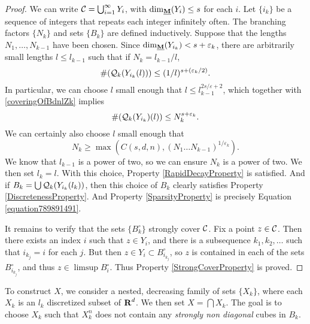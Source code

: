 \begin{proof}
	We can write $\operatorname{\mathcal{C}} = \bigcup_{i = 1}^\infty Y_i$, with $\operatorname{\dim_{\underline{\mathbf{M}}}}(Y_i) \leq s$ for each $i$. Let $\{ i_k \}$ be a sequence of integers that repeats each integer infinitely often. The branching factors $\{ N_k \}$ and sets $\{ B_k \}$ are defined inductively. Suppose that the lengths $N_1, \ldots, N_{k-1}$ have been chosen. Since $\operatorname{\dim_{\underline{\mathbf{M}}}}(Y_{i_k}) < s + \varepsilon_k$, there are arbitrarily small lengths $l \leq l_{k-1}$ such that if $N_k = l_{k-1}/l$,
	\begin{equation} \label{coveringOfBdnlZk}
		\# (\operatorname{\mathcal{Q}}_k(Y_{i_k}(l))) \leq (1/l)^{s + (\varepsilon_k/2)}.
	\end{equation}
	In particular, we can choose $l$ small enough that $l \leq l_{k-1}^{2s/\varepsilon + 2}$, which together with \eqref{coveringOfBdnlZk} implies
	\begin{equation} \label{equation789891491}
		\# (\operatorname{\mathcal{Q}}_k(Y_{i_k})(l)) \leq N_k^{s + \varepsilon_k}.
	\end{equation}
	We can certainly also choose $l$ small enough that
	\[ N_k \geq \max(C(s,d,n),(N_1 \dots N_{k-1})^{1/\varepsilon_k}). \]
	We know that $l_{k-1}$ is a power of two, so we can ensure $N_k$ is a power of two. We then set $l_k = l$. With this choice, Property \ref{RapidDecayProperty} is satisfied. And if $B_k = \bigcup \operatorname{\mathcal{Q}}_k(Y_{i_k}(l_k))$, then this choice of $B_k$ clearly satisfies Property \ref{DiscretenessProperty}. And Property \ref{SparsityProperty} is precisely Equation \eqref{equation789891491}.

	It remains to verify that the sets $\{ B_k^\circ \}$ strongly cover $\operatorname{\mathcal{C}}$. Fix a point $z \in \operatorname{\mathcal{C}}$. Then there exists an index $i$ such that $z \in Y_i$, and there is a subsequence $k_1, k_2, \dots$ such that $i_{k_j} = i$ for each $j$. But then $z \in Y_i \subset B_{i_{k_j}}^\circ$, so $z$ is contained in each of the sets $B_{i_{k_j}}^\circ$, and thus $z \in \limsup B_i^\circ$. Thus Property \ref{StrongCoverProperty} is proved.
\end{proof}

To construct $X$, we consider a nested, decreasing family of sets $\{ X_k \}$, where each $X_k$ is an $l_k$ discretized subset of $\operatorname{\mathbf{R}}^d$. We then set $X = \bigcap X_k$. The goal is to choose $X_k$ such that $X_k^n$ does not contain any {\it strongly non diagonal} cubes in $B_k$.

